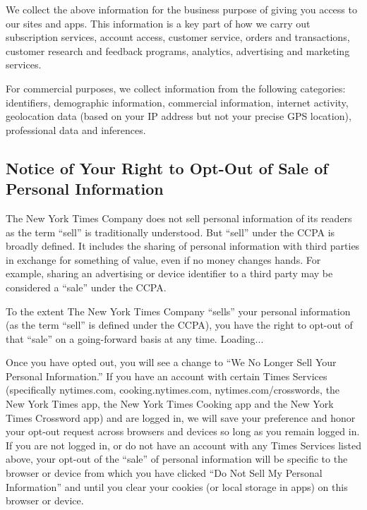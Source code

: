 We collect the above information for the business purpose of giving you
access to our sites and apps. This information is a key part of how we
carry out subscription services, account access, customer service,
orders and transactions, customer research and feedback programs,
analytics, advertising and marketing services.

For commercial purposes, we collect information from the following
categories: identifiers, demographic information, commercial
information, internet activity, geolocation data (based on your IP
address but not your precise GPS location), professional data and
inferences.

\hypertarget{notice-of-your-right-to-opt-out-of-sale-of-personal-information}{%
\subsection{Notice of Your Right to Opt-Out of Sale of Personal
Information}\label{notice-of-your-right-to-opt-out-of-sale-of-personal-information}}

The New York Times Company does not sell personal information of its
readers as the term ``sell'' is traditionally understood. But ``sell''
under the CCPA is broadly defined. It includes the sharing of personal
information with third parties in exchange for something of value, even
if no money changes hands. For example, sharing an advertising or device
identifier to a third party may be considered a ``sale'' under the CCPA.

To the extent The New York Times Company ``sells'' your personal
information (as the term ``sell'' is defined under the CCPA), you have
the right to opt-out of that ``sale'' on a going-forward basis at any
time. Loading...

Once you have opted out, you will see a change to ``We No Longer Sell
Your Personal Information.'' If you have an account with certain Times
Services (specifically nytimes.com, cooking.nytimes.com,
nytimes.com/crosswords, the New York Times app, the New York Times
Cooking app and the New York Times Crossword app) and are logged in, we
will save your preference and honor your opt-out request across browsers
and devices so long as you remain logged in. If you are not logged in,
or do not have an account with any Times Services listed above, your
opt-out of the ``sale'' of personal information will be specific to the
browser or device from which you have clicked ``Do Not Sell My Personal
Information'' and until you clear your cookies (or local storage in
apps) on this browser or device.

